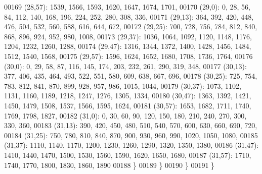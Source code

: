 \begin{DoxyCode}
00169       (28,57): 1539, 1566, 1593, 1620, 1647, 1674, 1701,
00170       (29,0): 0, 28, 56, 84, 112, 140, 168, 196, 224, 252, 280, 308, 336,
00171       (29,13): 364, 392, 420, 448, 476, 504, 532, 560, 588, 616, 644, 672,
00172       (29,25): 700, 728, 756, 784, 812, 840, 868, 896, 924, 952, 980, 1008,
00173       (29,37): 1036, 1064, 1092, 1120, 1148, 1176, 1204, 1232, 1260, 1288,
00174       (29,47): 1316, 1344, 1372, 1400, 1428, 1456, 1484, 1512, 1540, 1568,
00175       (29,57): 1596, 1624, 1652, 1680, 1708, 1736, 1764,
00176       (30,0): 0, 29, 58, 87, 116, 145, 174, 203, 232, 261, 290, 319, 348,
00177       (30,13): 377, 406, 435, 464, 493, 522, 551, 580, 609, 638, 667, 696,
00178       (30,25): 725, 754, 783, 812, 841, 870, 899, 928, 957, 986, 1015, 1044,
00179       (30,37): 1073, 1102, 1131, 1160, 1189, 1218, 1247, 1276, 1305, 1334,
00180       (30,47): 1363, 1392, 1421, 1450, 1479, 1508, 1537, 1566, 1595, 1624,
00181       (30,57): 1653, 1682, 1711, 1740, 1769, 1798, 1827,
00182       (31,0): 0, 30, 60, 90, 120, 150, 180, 210, 240, 270, 300, 330, 360,
00183       (31,13): 390, 420, 450, 480, 510, 540, 570, 600, 630, 660, 690, 720,
00184       (31,25): 750, 780, 810, 840, 870, 900, 930, 960, 990, 1020, 1050, 1080,
00185       (31,37): 1110, 1140, 1170, 1200, 1230, 1260, 1290, 1320, 1350, 1380,
00186       (31,47): 1410, 1440, 1470, 1500, 1530, 1560, 1590, 1620, 1650, 1680,
00187       (31,57): 1710, 1740, 1770, 1800, 1830, 1860, 1890
00188       \}
00189    \}
00190 \}
00191 \}
\end{DoxyCode}

